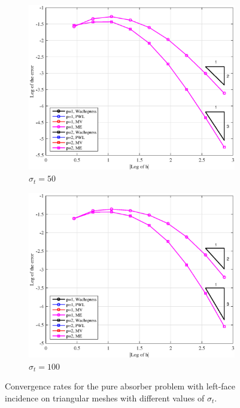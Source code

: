 \begin{figure}
{}
\vspace{1cm}
{
	\begin{subfigure}[b]{0.485\textwidth}
		\centering
		\label{subfig::PA_Left_Tri_sig50}
		\includegraphics[width=\textwidth]{figures/sec_BF/PAErr_Left_Tri_sig50.eps}
	\caption{$\sigma_t = 50$}
	\end{subfigure}
	\hfill
	\begin{subfigure}[b]{0.485\textwidth}
		\centering
		\label{subfig::PA_Left_Tri_sig100}
		\includegraphics[width=\textwidth]{figures/sec_BF/PAErr_Left_Tri_sig100.eps}
	\caption{$\sigma_t = 100$}
	\end{subfigure}
}
\caption{Convergence rates for the pure absorber problem with left-face incidence on triangular meshes with different values of $\sigma_t$.}
\label{fig::BF_Results_PA_Left_Tri}
\end{figure}

